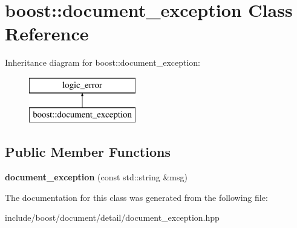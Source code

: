 \hypertarget{classboost_1_1document__exception}{\section{boost\-:\-:document\-\_\-exception Class Reference}
\label{classboost_1_1document__exception}
}
Inheritance diagram for boost\-:\-:document\-\_\-exception\-:\begin{figure}[H]
\begin{center}
\leavevmode
\includegraphics[height=2.000000cm]{classboost_1_1document__exception}
\end{center}
\end{figure}
\subsection*{Public Member Functions}
\begin{DoxyCompactItemize}
\item 
\hypertarget{classboost_1_1document__exception_aae571005033f3ba74b347294d5ddf495}{{\bfseries document\-\_\-exception} (const std\-::string \&msg)}\label{classboost_1_1document__exception_aae571005033f3ba74b347294d5ddf495}

\end{DoxyCompactItemize}


The documentation for this class was generated from the following file\-:\begin{DoxyCompactItemize}
\item 
include/boost/document/detail/document\-\_\-exception.\-hpp\end{DoxyCompactItemize}
